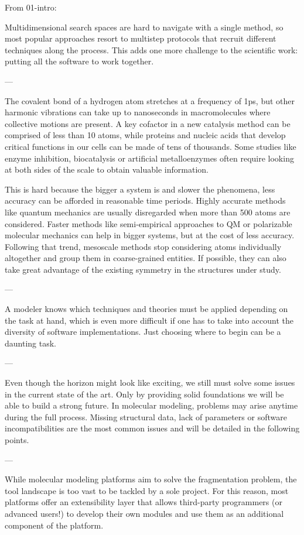 
From 01-intro:

Multidimensional search spaces are hard to navigate with a single method, so most popular approaches resort to multistep protocols that recruit different techniques along the process. This adds one more challenge to the scientific work: putting all the software to work together.

---

The covalent bond of a hydrogen atom stretches at a frequency of 1ps, but other harmonic vibrations can take up to nanoseconds in macromolecules where collective motions are present. A key cofactor in a new catalysis method can be comprised of less than 10 atoms, while proteins and nucleic acids that develop critical functions in our cells can be made of tens of thousands. Some studies like enzyme inhibition, biocatalysis or artificial metalloenzymes often require looking at both sides of the scale to obtain valuable information.

This is hard because the bigger a system is and slower the phenomena, less accuracy can be afforded in reasonable time periods. Highly accurate methods like quantum mechanics are usually disregarded when more than 500 atoms are considered. Faster methods like semi-empirical approaches to QM or polarizable molecular mechanics can help in bigger systems, but at the cost of less accuracy. Following that trend, mesoscale methods stop considering atoms individually altogether and group them in coarse-grained entities. If possible, they can also take great advantage of the existing symmetry in the structures under study.

---

A modeler knows which techniques and theories must be applied depending on the task at hand, which is even more difficult if one has to take into account the diversity of software implementations. Just choosing where to begin can be a daunting task.

---

Even though the horizon might look like exciting, we still must solve some issues in the current state of the art.  Only by providing solid foundations we will be able to build a strong future. In molecular modeling, problems may arise anytime during the full process. Missing structural data, lack of parameters or software incompatibilities are the most common issues and will be detailed in the following points.

---

While molecular modeling platforms aim to solve the fragmentation problem, the tool landscape is too vast to be tackled by a sole project. For this reason, most platforms offer an extensibility layer that allows third-party programmers (or advanced users!) to develop their own modules and use them as an additional component of the platform.

